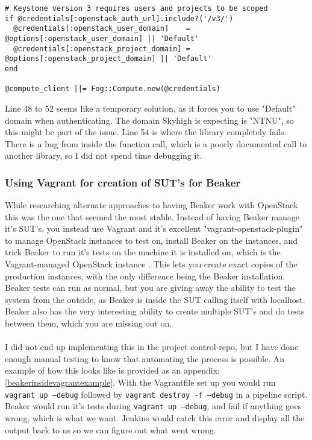 \begin{verbatim}
# Keystone version 3 requires users and projects to be scoped
if @credentials[:openstack_auth_url].include?('/v3/')
  @credentials[:openstack_user_domain]    = @options[:openstack_user_domain] || 'Default'
  @credentials[:openstack_project_domain] = @options[:openstack_project_domain] || 'Default'
end

@compute_client ||= Fog::Compute.new(@credentials)
\end{verbatim}

Line 48 to 52 seems like a temporary solution, as it forces you to use "Default" domain when authenticating. The domain Skyhigh is expecting is "NTNU", so this might be part of the issue. Line 54 is where the library completely fails. There is a bug from inside the function call, which is a poorly documented call to another library, so I did not spend time debugging it.

\subsubsection{Using Vagrant for creation of SUT's for Beaker} \label{beakerinsidevagrantexplanation}

While researching alternate approaches to having Beaker work with OpenStack this was the one that seemed the most stable. Instead of having Beaker manage it's SUT's, you instead use Vagrant and it's excellent "vagrant-openstack-plugin" to manage OpenStack instances to test on, install Beaker on the instances, and trick Beaker to run it's tests on the machine it is installed on, which is the Vagrant-managed OpenStack instance \cite{puppetmodulefunctionaltestingbeakerinsidevagrant}\cite{openstackpuppetmodulefunctionaltestingproposal}. This lets you create exact copies of the production instances, with the only difference being the Beaker installation. Beaker tests can run as normal, but you are giving away the ability to test the system from the outside, as Beaker is inside the SUT calling itself with localhost. Beaker also has the very interesting ability to create multiple SUT's and do tests between them, which you are missing out on.
\\
\\
I did not end up implementing this in the project control-repo, but I have done enough manual testing to know that automating the process is possible. An example of how this looks like is provided as an appendix: \ref{beakerinsidevagrantexample}. With the Vagrantfile set up you would run \texttt{vagrant up --debug} followed by \texttt{vagrant destroy -f --debug} in a pipeline script. Beaker would run it's tests during \texttt{vagrant up --debug}, and fail if anything goes wrong, which is what we want. Jenkins would catch this error and display all the output back to us so we can figure out what went wrong.


